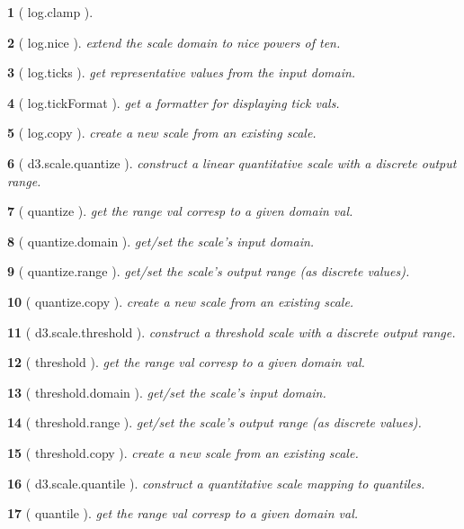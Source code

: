 \documentclass[10pt,landscape,letterpaper]{article}
\newcounter{thm}
\theoremstyle{mytheoremstyle}
\newtheorem*{thm}{}
\begin{document}
\begin{multicols}{3}
\begin{thm} [ log.clamp ]
\end{thm}\begin{thm} [ log.nice ]  extend the scale domain to nice powers of ten.
\end{thm}\begin{thm} [ log.ticks ]  get representative values from the input domain.
\end{thm}\begin{thm} [ log.tickFormat ]  get a formatter for displaying tick vals.
\end{thm}\begin{thm} [ log.copy ]  create a new scale from an existing scale.
\end{thm}\begin{thm} [ d3.scale.quantize ]  construct a linear quantitative scale with a discrete output range.
\end{thm}\begin{thm} [ quantize ]  get the range val corresp to a given domain val.
\end{thm}\begin{thm} [ quantize.domain ]  get/set the scale's input domain.
\end{thm}\begin{thm} [ quantize.range ]  get/set the scale's output range (as discrete values).
\end{thm}\begin{thm} [ quantize.copy ]  create a new scale from an existing scale.
\end{thm}\begin{thm} [ d3.scale.threshold ]  construct a threshold scale with a discrete output range.
\end{thm}\begin{thm} [ threshold ]  get the range val corresp to a given domain val.
\end{thm}\begin{thm} [ threshold.domain ]  get/set the scale's input domain.
\end{thm}\begin{thm} [ threshold.range ]  get/set the scale's output range (as discrete values).
\end{thm}\begin{thm} [ threshold.copy ]  create a new scale from an existing scale.
\end{thm}\begin{thm} [ d3.scale.quantile ]  construct a quantitative scale mapping to quantiles.
\end{thm}\begin{thm} [ quantile ]  get the range val corresp to a given domain val.

\end{thm}
\end{multicols}
\end{document}
